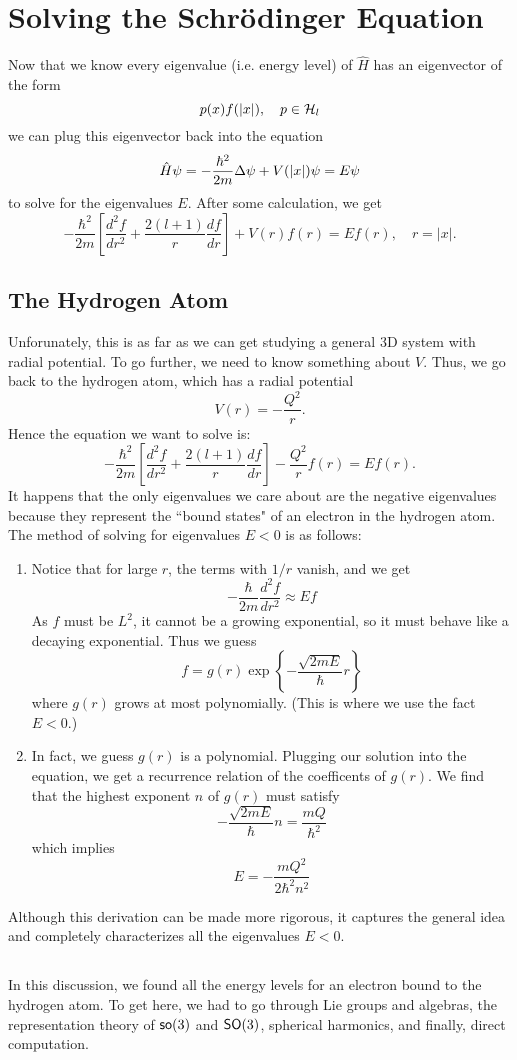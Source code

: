 \section{Solving the Schr\"{o}dinger Equation}
Now that we know every eigenvalue (i.e. energy level) of $\hat{H}$ has an eigenvector of the form
\[
    p(x)f(|x|), \quad p \in {\mathcal H}_l
\]
we can plug this eigenvector back into the equation
\[
    \hat{H}\psi = -\frac{\hbar^2}{2m}\Delta\psi + V(|x|)\psi = E\psi
\]
to solve for the eigenvalues $E$. After some calculation, we get
\[
    - \frac{\hbar^2}{2m}\left[ \frac{d^2f}{dr^2} + \frac{2(l+1)}{r} \frac{df}{dr} \right] + V(r)f(r) = Ef(r), \quad r = |x|.
\]
\subsection{The Hydrogen Atom}
Unforunately, this is as far as we can get studying a general 3D system with radial potential. To go further, we need to know something about $V$. Thus, we go back to the hydrogen atom, which has a radial potential
\[
    V(r) = - \frac{Q^2}{r}.
\]
Hence the equation we want to solve is:
\[
    - \frac{\hbar^2}{2m}\left[ \frac{d^2f}{dr^2} + \frac{2(l+1)}{r} \frac{df}{dr} \right] - \frac{Q^2}{r}f(r) = Ef(r).
\]
It happens that the only eigenvalues we care about are the negative eigenvalues because they represent the ``bound states" of an electron in the hydrogen atom. The method of solving for eigenvalues $E < 0$ is as follows:
\begin{enumerate}
    \item Notice that for large $r$, the terms with $1/r$ vanish, and we get
        \[
            - \frac{\hbar}{2m} \frac{d^2f}{dr^2} \approx Ef
        \]
        As $f$ must be $L^2$, it cannot be a growing exponential, so it must behave like a decaying exponential. Thus we guess
        \[
            f = g(r) \exp\left\{ - \frac{\sqrt{2mE}}{\hbar}r\right\}
        \]
        where $g(r)$ grows at most polynomially. (This is where we use the fact $E < 0$.)

    \item In fact, we guess $g(r)$ is a polynomial. Plugging our solution into the equation, we get a recurrence relation of the coefficents of $g(r)$. We find that the highest exponent $n$ of $g(r)$ must satisfy
        \[
            - \frac{\sqrt{2mE}}{\hbar} n = \frac{mQ}{\hbar^2}
        \]
        which implies
        \[
            E = - \frac{mQ^2}{2\hbar^2n^2}
        \]
\end{enumerate}
Although this derivation can be made more rigorous, it captures the general idea and completely characterizes all the eigenvalues $E < 0$.

\subsection{}
In this discussion, we found all the energy levels for an electron bound to the hydrogen atom. To get here, we had to go through Lie groups and algebras, the representation theory of $\operatorname{\textsf{so}}(3)$ and $\operatorname{\textsf{SO}}(3)$, spherical harmonics, and finally, direct computation.
